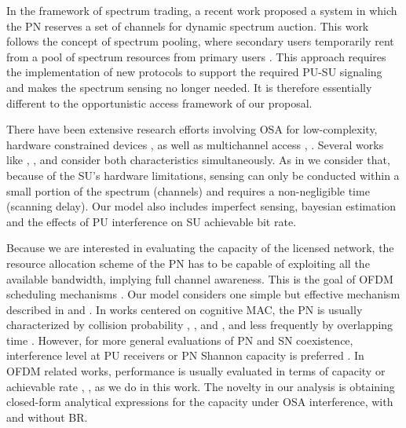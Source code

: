 In the framework of spectrum trading, a recent work \cite{ref:Reservation5} proposed a system in which the PN reserves a set of channels for dynamic spectrum auction. This work follows the concept of spectrum pooling, where secondary users temporarily rent from a pool of spectrum resources from primary users \cite{ref:BookCognitive}. This approach requires the implementation of new protocols to support the required PU-SU signaling and makes the spectrum sensing no longer needed. It is therefore essentially different to the opportunistic access framework of our proposal.


There have been extensive research efforts involving OSA for low-complexity, hardware constrained devices \cite{ref:SensingMultichannel}, \cite{ref:lowComplexity} as well as multichannel access \cite{ref:MultichannelMAC}, \cite{ref:MultichannelMAC2}. 
Several works like \cite{ref:HCMAC}, \cite{ref:DiscoveringOpportunities}, \cite{ref:MultichannelMultistage} and \cite{ref:StoppingRule} consider both characteristics simultaneously. As in \cite{ref:HCMAC} we consider that, because of the SU's hardware limitations, sensing can only be conducted within a small portion of the spectrum (channels) and requires a non-negligible time (scanning delay). Our model also includes imperfect sensing, bayesian estimation and the effects of PU interference on SU achievable bit rate.  


Because we are interested in evaluating the capacity of the licensed network, the resource allocation scheme of the PN has to be capable of exploiting all the available bandwidth, implying full channel awareness. This is the goal of OFDM scheduling mechanisms \cite{ref:OFDMtutorial}. Our model considers one simple but effective mechanism described in \cite{ref:OFDMtutorial} and \cite{ref:PSD}.
In works centered on cognitive MAC, the PN is usually characterized by collision probability \cite{ref:MultichannelMultistage}, \cite{ref:PacketConstraints}, \cite{ref:POMDP} and \cite{ref:OptimalStrategies}, and less frequently by overlapping time \cite{ref:OpportunisticAccess}.
However, for more general evaluations of PN and SN coexistence, interference level at PU receivers or PN Shannon capacity is preferred \cite{ref:Coexistence}. In OFDM related works, performance is usually evaluated in terms of capacity or achievable rate \cite{ref:OFDMtutorial}, \cite{ref:PSD}, as we do in this work. The novelty in our analysis is obtaining closed-form analytical expressions for the capacity under OSA interference, with and without BR.

